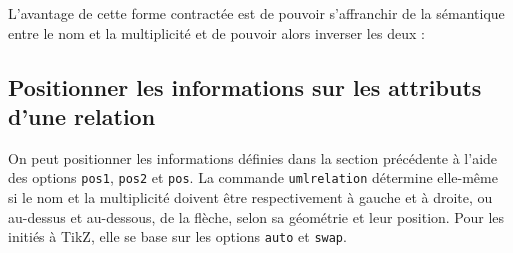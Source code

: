 \documentclass[a4paper,11pt]{report}
\newcommand{\inputTikZ}[1]{%
  }%
\newcommand{\inputTikZ}[1]{%
    \texttt{[image: fig/\#1.pdf]}%
  }%
\newcommand{\TikZ}{{\sc TikZ}}
\begin{document}
\medskip

\begin{minipage}{0.5\textwidth}

\end{minipage}
\begin{minipage}{0.4\textwidth}
\begin{center}
\inputTikZ{relationattr}
\end{center}
\end{minipage}

\medskip

L'avantage de cette forme contractée est de pouvoir s'affranchir de la sémantique entre le nom et la multiplicité et de pouvoir alors inverser les deux :

\medskip

\begin{minipage}{0.5\textwidth}

\end{minipage}
\begin{minipage}{0.4\textwidth}
\begin{center}
\inputTikZ{relationattr2}
\end{center}
\end{minipage}

\medskip

\subsection{Positionner les informations sur les attributs d'une relation}\label{ss.relposattr}

On peut positionner les informations définies dans la section précédente à l'aide des options {\tt pos1}, {\tt pos2} et {\tt pos}.
La commande {\tt umlrelation} détermine elle-même si le nom et la multiplicité doivent être respectivement à gauche et à droite, ou au-dessus et au-dessous, de la flèche, selon sa géométrie et leur position. Pour les initiés à \TikZ, elle se base sur les options {\tt auto} et {\tt swap}.

\medskip

\begin{minipage}{0.5\textwidth}

\end{minipage}
\begin{minipage}{0.4\textwidth}
\begin{center}
\inputTikZ{relationpos}
\end{center}
\end{minipage}
\end{document}

